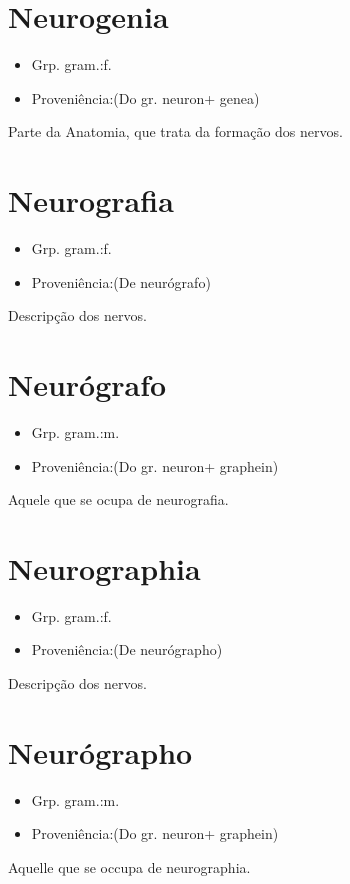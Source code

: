 \section{Neurogenia}
\begin{itemize}
\item {Grp. gram.:f.}
\end{itemize}
\begin{itemize}
\item {Proveniência:(Do gr. \textunderscore neuron\textunderscore  + \textunderscore genea\textunderscore )}
\end{itemize}
Parte da Anatomia, que trata da formação dos nervos.
\section{Neurografia}
\begin{itemize}
\item {Grp. gram.:f.}
\end{itemize}
\begin{itemize}
\item {Proveniência:(De \textunderscore neurógrafo\textunderscore )}
\end{itemize}
Descripção dos nervos.
\section{Neurógrafo}
\begin{itemize}
\item {Grp. gram.:m.}
\end{itemize}
\begin{itemize}
\item {Proveniência:(Do gr. \textunderscore neuron\textunderscore  + \textunderscore graphein\textunderscore )}
\end{itemize}
Aquele que se ocupa de neurografia.
\section{Neurographia}
\begin{itemize}
\item {Grp. gram.:f.}
\end{itemize}
\begin{itemize}
\item {Proveniência:(De \textunderscore neurógrapho\textunderscore )}
\end{itemize}
Descripção dos nervos.
\section{Neurógrapho}
\begin{itemize}
\item {Grp. gram.:m.}
\end{itemize}
\begin{itemize}
\item {Proveniência:(Do gr. \textunderscore neuron\textunderscore  + \textunderscore graphein\textunderscore )}
\end{itemize}
Aquelle que se occupa de neurographia.
